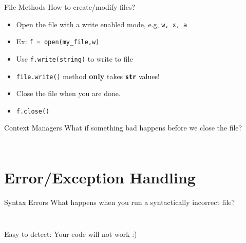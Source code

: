     \begin{frame}{File Methods}
        \LARGE
        How to create/modify files?
        \begin{itemize}
            \item Open the file with a write enabled mode, e.g, \texttt{w, x, a}
            \pause
            \item Ex: \texttt{f = open(\textquotesingle my\_file\textquotesingle ,\textquotesingle w\textquotesingle )}
            \pause
            \item Use \texttt{f.write(string)} to write to file
            \pause
            \item \texttt{file.write()} method \textbf{only} takes \texttt{\textbf{str}} values!
            \pause
            \item Close the file when you are done.
            \pause
            \item \texttt{f.close()}
        \end{itemize}
    \end{frame}

    \begin{frame}{Context Managers}
        \LARGE
        What if something bad happens before we close the file?
        \Large
        \inputminted[frame=single,framesep=2pt,firstline=1,lastline=6]{python3}{./code_examples/with_open.py}
        \inputminted[frame=single,framesep=2pt,firstline=8]{python3}{./code_examples/with_open.py}
    \end{frame}

    \section{Error/Exception Handling}
    \begin{frame}{Syntax Errors}
        \LARGE
        What happens when you run a syntactically incorrect file?
        \pause
        \inputminted[frame=single,framesep=2pt,firstline=1,lastline=3]{python3}{./code_examples/syntax_error.py}
        \pause
        \inputminted[frame=single,framesep=2pt,firstline=5]{python3}{./code_examples/syntax_error.py}
        Easy to detect: Your code will not work :)
    \end{frame}

